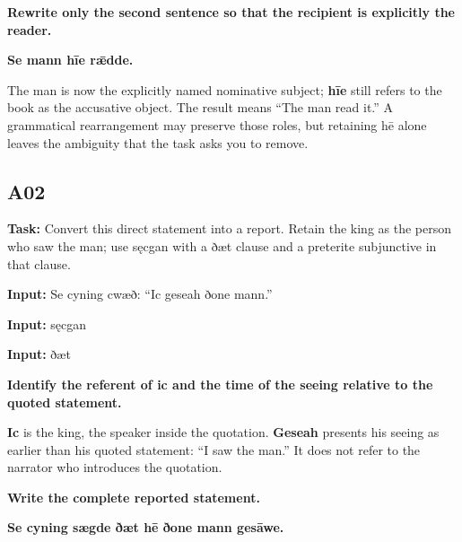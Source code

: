 \par\begin{minipage}{\linewidth}\raggedright
\textbf{Rewrite only the second sentence so that the recipient is explicitly the reader.}

\textbf{Se mann hīe rǣdde.}
\end{minipage}\par

The man is now the explicitly named nominative subject; \textbf{hīe} still refers to the book as the accusative object. The result means “The man read it.” A grammatical rearrangement may preserve those roles, but retaining hē alone leaves the ambiguity that the task asks you to remove.

\subsection*{A02}

\textbf{Task:} Convert this direct statement into a report. Retain the king as the person who saw the man; use sęcgan with a ðæt clause and a preterite subjunctive in that clause.

\textbf{Input:} Se cyning cwæð: “Ic geseah ðone mann.”

\textbf{Input:} sęcgan

\textbf{Input:} ðæt

\textbf{Identify the referent of ic and the time of the seeing relative to the quoted statement.}

\textbf{Ic} is the king, the speaker inside the quotation. \textbf{Geseah} presents his seeing as earlier than his quoted statement: “I saw the man.” It does not refer to the narrator who introduces the quotation.

\par\begin{minipage}{\linewidth}\raggedright
\textbf{Write the complete reported statement.}

\textbf{Se cyning sægde ðæt hē ðone mann gesāwe.}
\end{minipage}\par


